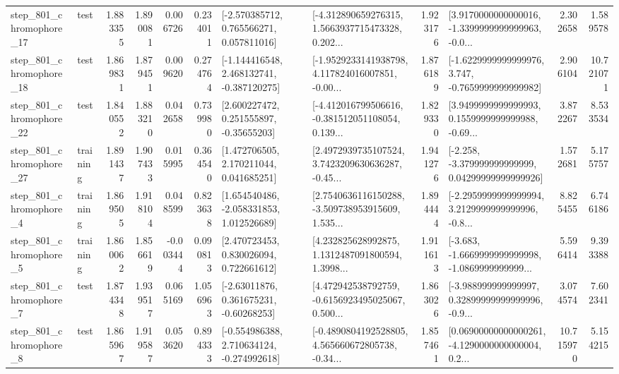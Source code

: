\begin{tabular}{llrrrrllrlrr}
  step\_801\_chromophore\_17 &      test &      1.883355 &    1.890081 &      0.006726 &  0.234011 &    [-2.570385712, 0.765566271, 0.057811016] &  [-4.312890659276315, 1.5663937715473328, 0.202... &       1.923176 &  [3.9170000000000016, -1.3399999999999963, -0.0... &            2.302658 &          1.589578 \\
  step\_801\_chromophore\_18 &      test &      1.869831 &    1.879451 &      0.009620 &  0.274764 &   [-1.144416548, 2.468132741, -0.387120275] &  [-1.9529233141938798, 4.117824016007851, -0.00... &       1.876189 &  [-1.6229999999999976, 3.747, -0.7659999999999982] &            2.906104 &         10.721071 \\
  step\_801\_chromophore\_22 &      test &      1.840552 &    1.883210 &      0.042658 &  0.739980 &     [2.600227472, 0.251555897, -0.35655203] &  [-4.412016799506616, -0.381512051108054, 0.139... &       1.829330 &  [3.9499999999999993, 0.1559999999999988, -0.69... &            3.872267 &          8.533534 \\
  step\_801\_chromophore\_27 &  training &      1.891437 &    1.907433 &      0.015995 &  0.364540 &     [1.472706505, 2.170211044, 0.041685251] &  [2.4972939735107524, 3.7423209630636287, -0.45... &       1.941276 &  [-2.258, -3.379999999999999, 0.04299999999999926] &            1.572681 &          5.175757 \\
   step\_801\_chromophore\_4 &  training &      1.869505 &    1.918104 &      0.048599 &  0.823638 &    [1.654540486, -2.058331853, 1.012526689] &  [2.7540636116150288, -3.509738953915609, 1.535... &       1.894444 &  [-2.2959999999999994, 3.2129999999999996, -0.8... &            8.825455 &          6.746186 \\
   step\_801\_chromophore\_5 &  training &      1.860062 &    1.856619 &     -0.003444 &  0.090813 &     [2.470723453, 0.830026094, 0.722661612] &  [4.232825628992875, 1.1312487091800594, 1.3998... &       1.911613 &  [-3.683, -1.6669999999999998, -1.0869999999999... &            5.596414 &          9.393388 \\
   step\_801\_chromophore\_7 &      test &      1.874348 &    1.939517 &      0.065169 &  1.056963 &     [-2.63011876, 0.361675231, -0.60268253] &  [4.472942538792759, -0.6156923495025067, 0.500... &       1.863026 &  [-3.988999999999997, 0.32899999999999996, -0.9... &            3.074574 &          7.602341 \\
   step\_801\_chromophore\_8 &      test &      1.865967 &    1.919587 &      0.053620 &  0.894333 &   [-0.554986388, 2.710634124, -0.274992618] &  [-0.4890804192528805, 4.565660672805738, -0.34... &       1.857461 &  [0.06900000000000261, -4.1290000000000004, 0.2... &           10.715970 &          5.154215 \\

\end{tabular}
